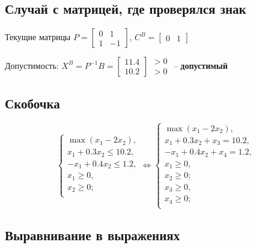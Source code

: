 \subsection{Случай с матрицей, где проверялся знак}

Текущие матрицы $P=\begin{bmatrix}
0 & 1 \\ 1 & -1
\end{bmatrix}$, $C^B=\begin{bmatrix}
0 & 1
\end{bmatrix}$

Допустимость: $X^B=P^{-1}B=\begin{bmatrix}
11.4 \\ 10.2
\end{bmatrix}\begin{matrix}
>0 \\ >0
\end{matrix}$ -- \textbf{допустимый}

\subsection{Скобочка}

\begin{equation}
	\left\{\begin{aligned}
		\max\left(x_1-2x_2\right), \\
		x_1+0.3x_2\leq 10.2, \\
		-x_1+0.4x_2\leq 1.2, \\
		x_1\geq 0, \\
		x_2\geq 0; \\
	\end{aligned}\right. \Longleftrightarrow
	\left\{\begin{aligned}
		\max\left(x_1-2x_2\right), \\
		x_1+0.3x_2+x_3=10.2, \\
		-x_1+0.4x_2+x_4=1.2, \\
		x_1\geq 0, \\
		x_2\geq 0; \\
		x_3\geq 0, \\
		x_4\geq 0; \\
	\end{aligned}\right.
\end{equation}

\subsection{Выравнивание в выражениях}

